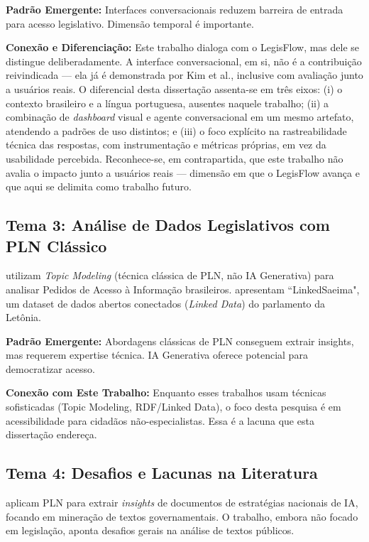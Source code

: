 \textbf{Padrão Emergente:} Interfaces conversacionais reduzem barreira de entrada para acesso legislativo. Dimensão temporal é importante.

\textbf{Conexão e Diferenciação:} Este trabalho dialoga com o LegisFlow, mas dele se distingue deliberadamente. A interface conversacional, em si, não é a contribuição reivindicada --- ela já é demonstrada por Kim et al., inclusive com avaliação junto a usuários reais. O diferencial desta dissertação assenta-se em três eixos: (i) o contexto brasileiro e a língua portuguesa, ausentes naquele trabalho; (ii) a combinação de \textit{dashboard} visual e agente conversacional em um mesmo artefato, atendendo a padrões de uso distintos; e (iii) o foco explícito na rastreabilidade técnica das respostas, com instrumentação e métricas próprias, em vez da usabilidade percebida. Reconhece-se, em contrapartida, que este trabalho não avalia o impacto junto a usuários reais --- dimensão em que o LegisFlow avança e que aqui se delimita como trabalho futuro.

\subsection{Tema 3: Análise de Dados Legislativos com PLN Clássico}

 utilizam \textit{Topic Modeling} (técnica clássica de PLN, não IA Generativa) para analisar Pedidos de Acesso à Informação brasileiros.  apresentam ``LinkedSaeima", um dataset de dados abertos conectados (\textit{Linked Data}) do parlamento da Letônia.

\textbf{Padrão Emergente:} Abordagens clássicas de PLN conseguem extrair insights, mas requerem expertise técnica. IA Generativa oferece potencial para democratizar acesso.

\textbf{Conexão com Este Trabalho:} Enquanto esses trabalhos usam técnicas sofisticadas (Topic Modeling, RDF/Linked Data), o foco desta pesquisa é em acessibilidade para cidadãos não-especialistas. Essa é a lacuna que esta dissertação endereça.

\subsection{Tema 4: Desafios e Lacunas na Literatura}

 aplicam PLN para extrair \textit{insights} de documentos de estratégias nacionais de IA, focando em mineração de textos governamentais. O trabalho, embora não focado em legislação, aponta desafios gerais na análise de textos públicos.


